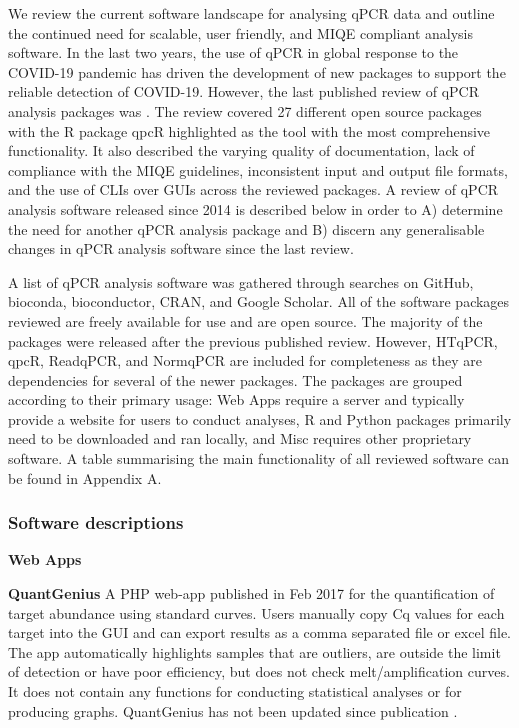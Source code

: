 \documentclass[../main.tex]{subfiles}
\begin{document}
We review the current software landscape for analysing qPCR data and outline the continued need for scalable, user friendly, and MIQE compliant analysis software.
In the last two years, the use of qPCR in global response to the COVID-19 pandemic has driven the development of new packages to support the reliable detection of COVID-19.
However, the last published review of qPCR analysis packages was \cite{Pabinger2014}.
The review covered 27 different open source packages with the R package qpcR highlighted as the tool with the most comprehensive functionality.
It also described the varying quality of documentation, lack of compliance with the MIQE guidelines, inconsistent input and output file formats, and the use of CLIs over GUIs across the reviewed packages.
A review of qPCR analysis software released since 2014 is described below in order to A) determine the need for another qPCR analysis package and B) discern any generalisable changes in qPCR analysis software since the last review.

A list of qPCR analysis software was gathered through searches on GitHub, bioconda, bioconductor, CRAN, and Google Scholar.
All of the software packages reviewed are freely available for use and are open source.
The majority of the packages were released after the previous published review.
However, HTqPCR, qpcR, ReadqPCR, and NormqPCR are included for completeness as they are dependencies for several of the newer packages.
The packages are grouped according to their primary usage: Web Apps require a server and typically provide a website for users to conduct analyses, R and Python packages primarily need to be downloaded and ran locally, and Misc requires other proprietary software. A table summarising the main functionality of all reviewed software can be found in Appendix A.

\subsubsection{Software descriptions}

\textbf{Web Apps}

\textbf{QuantGenius} A PHP web-app published in Feb 2017 for the quantification of target abundance using standard curves. 
Users manually copy Cq values for each target into the GUI and can export results as a comma separated file or excel file. 
The app automatically highlights samples that are outliers, are outside the limit of detection or have poor efficiency, but does not check melt/amplification curves. 
It does not contain any functions for conducting statistical analyses or for producing graphs. 
QuantGenius has not been updated since publication \parencite{Baebler2017}.
\end{document}
